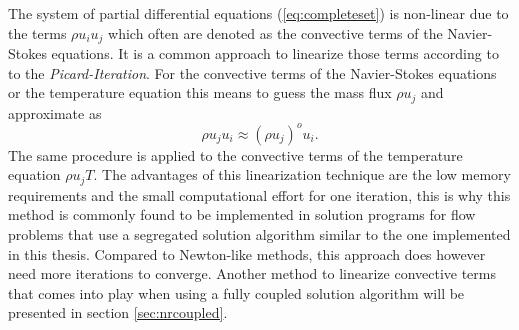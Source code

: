 The system of partial differential equations (\ref{eq:completeset}) is non-linear due to the terms \(\rho u_i u_j\) which often are denoted as the convective terms of the Navier-Stokes equations. It is a common approach to linearize those terms according to to the \emph{Picard-Iteration}. For the convective terms of the Navier-Stokes equations or the temperature equation this means to guess the mass flux \( \rho u_j\) and approximate as
\begin{displaymath}
  \rho u_j u_i \approx \left( \rho u_j \right)^o u_i.
\end{displaymath}
The same procedure is applied to the convective terms of the temperature equation \(\rho u_j T\). The advantages of this linearization technique are the low memory requirements and the small computational effort for one iteration, this is why this method is commonly found to be implemented in solution programs for flow problems that use a segregated solution algorithm similar to the one implemented in this thesis. Compared to Newton-like methods, this approach does however need more iterations to converge. Another method to linearize convective terms that comes into play when using a fully coupled solution algorithm will be presented in section \ref{sec:nrcoupled}.

